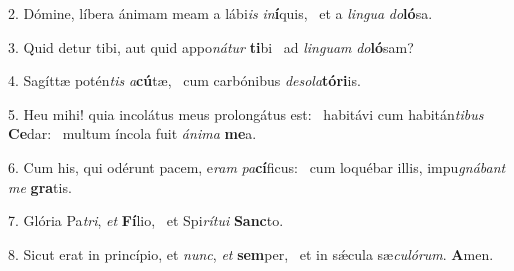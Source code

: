 2. Dómine, líbera ánimam meam a lábi\textit{is} \textit{in}\textbf{í}quis, \ast\  et a \textit{lin}\textit{gua} \textit{do}\textbf{ló}sa.\

3. Quid detur tibi, aut quid appo\textit{ná}\textit{tur} \textbf{ti}bi \ast\  ad \textit{lin}\textit{guam} \textit{do}\textbf{ló}sam?\

4. Sagíttæ potén\textit{tis} \textit{a}\textbf{cú}tæ, \ast\  cum carbónibus \textit{de}\textit{so}\textit{la}\textbf{tó}\textbf{ri}is.\

5. Heu mihi! quia incolátus meus prolongátus est: \dag\  habitávi cum habitán\textit{ti}\textit{bus} \textbf{Ce}dar: \ast\  multum íncola fuit \textit{á}\textit{ni}\textit{ma} \textbf{me}a.\

6. Cum his, qui odérunt pacem, e\textit{ram} \textit{pa}\textbf{cí}ficus: \ast\  cum loquébar illis, impu\textit{gná}\textit{bant} \textit{me} \textbf{gra}tis.\

7. Glória Pa\textit{tri}, \textit{et} \textbf{Fí}lio, \ast\  et Spi\textit{rí}\textit{tu}\textit{i} \textbf{Sanc}to.\

8. Sicut erat in princípio, et \textit{nunc}, \textit{et} \textbf{sem}per, \ast\  et in sǽcula sæ\textit{cu}\textit{ló}\textit{rum}. \textbf{A}men.\

